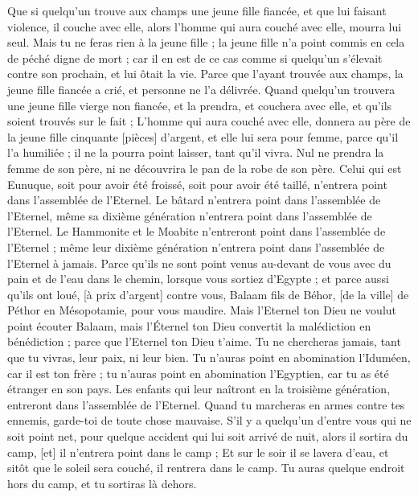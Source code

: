 \begin{multicols}{2}
Que si quelqu'un trouve aux champs une jeune fille fiancée, et que lui faisant violence, il couche avec elle, alors l'homme qui aura couché avec elle, mourra lui seul.
Mais tu ne feras rien à la jeune fille ; la jeune fille n'a point commis en cela de péché digne de mort ; car il en est de ce cas comme si quelqu'un s'élevait contre son prochain, et lui ôtait la vie.
Parce que l'ayant trouvée aux champs, la jeune fille fiancée a crié, et personne ne l'a délivrée.
Quand quelqu'un trouvera une jeune fille vierge non fiancée, et la prendra, et couchera avec elle, et qu'ils soient trouvés sur le fait ;
L'homme qui aura couché avec elle, donnera au père de la jeune fille cinquante [pièces] d'argent, et elle lui sera pour femme, parce qu'il l'a humiliée ; il ne la pourra point laisser, tant qu'il vivra.
Nul ne prendra la femme de son père, ni ne découvrira le pan de la robe de son père.
\VerseOne{}Celui qui est Eunuque, soit pour avoir été froissé, soit pour avoir été taillé, n'entrera point dans l'assemblée de l'Eternel.
Le bâtard n'entrera point dans l'assemblée de l'Eternel, même sa dixième génération n'entrera point dans l'assemblée de l'Eternel.
Le Hammonite et le Moabite n'entreront point dans l'assemblée de l'Eternel ; même leur dixième génération n'entrera point dans l'assemblée de l'Eternel à jamais.
Parce qu'ils ne sont point venus au-devant de vous avec du pain et de l'eau dans le chemin, lorsque vous sortiez d'Egypte ; et parce aussi qu'ils ont loué, [à prix d'argent] contre vous, Balaam fils de Béhor, [de la ville] de Péthor en Mésopotamie, pour vous maudire.
Mais l'Eternel ton Dieu ne voulut point écouter Balaam, mais l'Éternel ton Dieu convertit la malédiction en bénédiction ; parce que l'Eternel ton Dieu t'aime.
Tu ne chercheras jamais, tant que tu vivras, leur paix, ni leur bien.
Tu n'auras point en abomination l'Iduméen, car il est ton frère ; tu n'auras point en abomination l'Egyptien, car tu as été étranger en son pays.
Les enfants qui leur naîtront en la troisième génération, entreront dans l'assemblée de l'Eternel.
Quand tu marcheras en armes contre tes ennemis, garde-toi de toute chose mauvaise.
S'il y a quelqu'un d'entre vous qui ne soit point net, pour quelque accident qui lui soit arrivé de nuit, alors il sortira du camp, [et] il n'entrera point dans le camp ;
Et sur le soir il se lavera d'eau, et sitôt que le soleil sera couché, il rentrera dans le camp.
Tu auras quelque endroit hors du camp, et tu sortiras là dehors.

\end{multicols}
